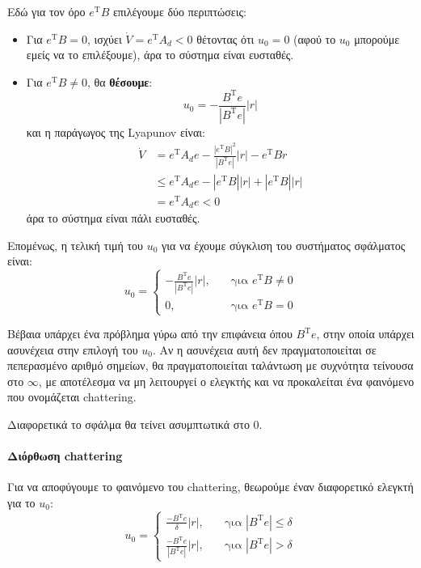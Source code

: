 \documentclass[11pt,a4paper,notitlepage,fleqn]{article}
\begin{document}
Εδώ για τον όρο \( e^{\mathrm T} B \) επιλέγουμε δύο περιπτώσεις:
\begin{itemize}
	\item Για \( e^{\mathrm T} B = 0 \), ισχύει \( \dot V = e^{\mathrm T} A_d < 0 \) θέτοντας ότι \( u_0 = 0 \) (αφού το \( u_0 \) μπορούμε εμείς να το επιλέξουμε), άρα το σύστημα είναι ευσταθές.
	\item Για \( e^{\mathrm T} B \neq 0 \), θα \textbf{θέσουμε}:
	\[
	u_0 = -\frac{B^{\mathrm T} e}{\left| B^{\mathrm T} e \right|}|r|
	\]
	και η παράγωγος της Lyapunov είναι:
	\begin{align*}
		\dot V &= e^{\mathrm T} A_d e -\frac{\left|e^{\mathrm T}B\right|^2}{\left|B^{\mathrm T}e\right|}|r| - e^{\mathrm T} B r
		\\ &\leq e^{\mathrm T}A_d e - \left| e^{\mathrm T}B \right||r|
		+ \left| e^{\mathrm T} B \right| |r|
		\\ &= e^{\mathrm T} A_d e < 0
	\end{align*}
	άρα το σύστημα είναι πάλι ευσταθές.
\end{itemize}

Επομένως, η τελική τιμή του \( u_0 \) για να έχουμε σύγκλιση του
συστήματος σφάλματος είναι:
\[
u_0 = \begin{cases}
-\frac{B^{\mathrm T}e}{\left| B^{\mathrm T}e \right|}|r|,
&\quad \text{για } e^{\mathrm T} B \neq 0 \\
0,&\quad \text{για } e^{\mathrm T} B = 0
\end{cases}
\]

Βέβαια υπάρχει ένα πρόβλημα γύρω από την επιφάνεια όπου
\( B^{\mathrm T}e \), στην οποία υπάρχει ασυνέχεια στην επιλογή του
\( u_0 \). Αν η ασυνέχεια αυτή δεν πραγματοποιείται σε πεπερασμένο
αριθμό σημείων, θα πραγματοποιείται ταλάντωση με συχνότητα τείνουσα στο
\( \infty \), με αποτέλεσμα να μη λειτουργεί ο ελεγκτής και να προκαλείται ένα φαινόμενο που ονομάζεται chattering.

Διαφορετικά το σφάλμα θα τείνει ασυμπτωτικά στο 0.

\paragraph{Διόρθωση chattering}
Για να αποφύγουμε το φαινόμενο του chattering, θεωρούμε έναν διαφορετικό
ελεγκτή για το \( u_0 \):
\[
u_0 = \begin{cases}
\frac{-B^{\mathrm T}e}{\delta}|r|, &\quad \text{για } \left|B^{\mathrm T} e\right| \leq \delta\\
\frac{-B^{\mathrm T} e}{\left| B^{\mathrm T} e \right|}|r|, &\quad \text{για } \left| B^{\mathrm T}e \right| > \delta
\end{cases}
\]
\end{document}

